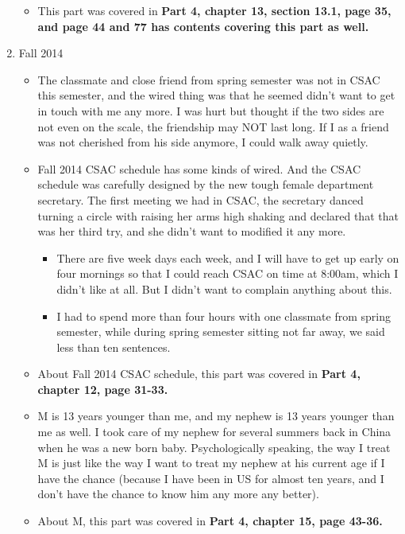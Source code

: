 \documentclass[9pt,b5paper]{article}
\begin{document}
\begin{enumerate}
\begin{itemize}
\item This part was covered in \textbf{Part 4, chapter 13, section 13.1, page 35, and page 44 and 77 has contents covering this part as well.}
\end{itemize}
\item Fall 2014
\label{sec-12-3-8-2}
\begin{itemize}
\item The classmate and close friend from spring semester was not in CSAC this semester, and the wired thing was that he seemed didn't want to get in touch with me any more. I was hurt but thought if the two sides are not even on the scale, the friendship may NOT last long. If I as a friend was not cherished from his side anymore, I could walk away quietly.
\item Fall 2014 CSAC schedule has some kinds of wired. And the CSAC schedule was carefully designed by the new tough female department secretary. The first meeting we had in CSAC, the secretary danced turning a circle with raising her arms high shaking and declared that that was her third try, and she didn't want to modified it any more. 
\begin{itemize}
\item There are five week days each week, and I will have to get up early on four mornings so that I could reach CSAC on time at 8:00am, which I didn't like at all. But I didn't want to complain anything about this.
\item I had to spend more than four hours with one classmate from spring semester, while during spring semester sitting not far away, we said less than ten sentences.
\end{itemize}
\item About Fall 2014 CSAC schedule, this part was covered in \textbf{Part 4, chapter 12, page 31-33.}
\item M is 13 years younger than me, and my nephew is 13 years younger than me as well. I took care of my nephew for several summers back in China when he was a new born baby. Psychologically speaking, the way I treat M is just like the way I want to treat my nephew at his current age if I have the chance (because I have been in US for almost ten years, and I don't have the chance to know him any more any better).
\item About M, this part was covered in \textbf{Part 4, chapter 15, page 43-36.}
\end{itemize}
\end{enumerate}
\end{document}

